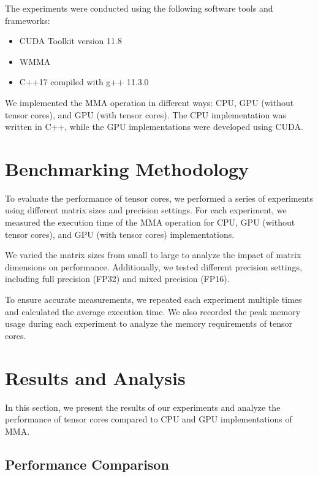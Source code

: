 \documentclass[conference]{IEEEtran}
\begin{document}
  The experiments were conducted using the following software tools and frameworks:
  
  \begin{itemize}
    \item CUDA Toolkit version 11.8
    \item WMMA
    \item C++17 compiled with g++ 11.3.0
  \end{itemize}
  
  We implemented the MMA operation in different ways: CPU, GPU (without tensor cores), and GPU (with tensor cores). 
  The CPU implementation was written in C++, while the GPU implementations were developed using CUDA.

  
  \section{Benchmarking Methodology}\label{sec:benchmarking-methodology}
  
  To evaluate the performance of tensor cores, we performed a series of experiments using different 
  matrix sizes and precision settings. For each experiment, we measured the execution time of the 
  MMA operation for CPU, GPU (without tensor cores), and GPU (with tensor cores) implementations.
  
  We varied the matrix sizes from small to large to analyze the impact of matrix dimensions on 
  performance. Additionally, we tested different precision settings, including full precision (FP32)
  and mixed precision (FP16).
  
  To ensure accurate measurements, we repeated each experiment multiple times and calculated 
  the average execution time. We also recorded the peak memory usage during each experiment to 
  analyze the memory requirements of tensor cores.
  
  \section{Results and Analysis}\label{sec:results-analysis}
  
  In this section, we present the results of our experiments and analyze the performance of 
  tensor cores compared to CPU and GPU implementations of MMA.

  
  \subsection{Performance Comparison}\label{sec:performance-comparison}
\end{document}
